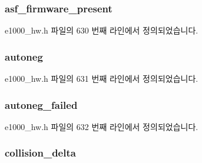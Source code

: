 \subsubsection[{\texorpdfstring{asf\+\_\+firmware\+\_\+present}{asf_firmware_present}}]{ asf\+\_\+firmware\+\_\+present}\hypertarget{structe1000__mac__info_aec5701ac9ed699c35dc2accc35b1c473}{}\label{structe1000__mac__info_aec5701ac9ed699c35dc2accc35b1c473}


e1000\+\_\+hw.\+h 파일의 630 번째 라인에서 정의되었습니다.

\subsubsection[{\texorpdfstring{autoneg}{autoneg}}]{ autoneg}\hypertarget{structe1000__mac__info_a062c0e2af8df1b0f13d20b02dceae500}{}\label{structe1000__mac__info_a062c0e2af8df1b0f13d20b02dceae500}


e1000\+\_\+hw.\+h 파일의 631 번째 라인에서 정의되었습니다.

\subsubsection[{\texorpdfstring{autoneg\+\_\+failed}{autoneg_failed}}]{ autoneg\+\_\+failed}\hypertarget{structe1000__mac__info_a323c5f398a127c5668b296a71e00572e}{}\label{structe1000__mac__info_a323c5f398a127c5668b296a71e00572e}


e1000\+\_\+hw.\+h 파일의 632 번째 라인에서 정의되었습니다.

\subsubsection[{\texorpdfstring{collision\+\_\+delta}{collision_delta}}]{ collision\+\_\+delta}\hypertarget{structe1000__mac__info_a1b90360155b002404ec343c9da58db13}{}\label{structe1000__mac__info_a1b90360155b002404ec343c9da58db13}



